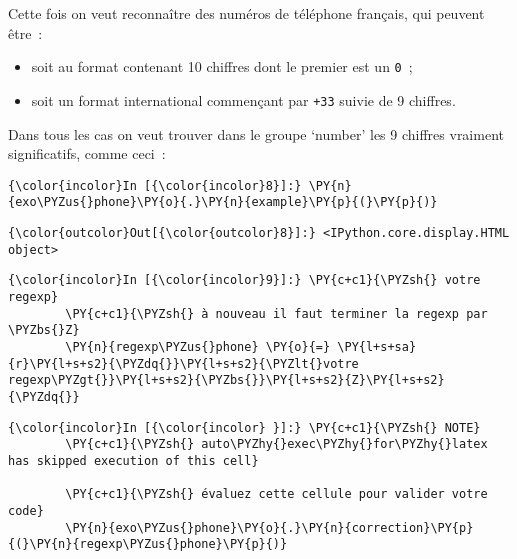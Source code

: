     Cette fois on veut reconnaître des numéros de téléphone français, qui
peuvent être~:

\begin{itemize}
\tightlist
\item
  soit au format contenant 10 chiffres dont le premier est un
  \texttt{0}~;
\item
  soit un format international commençant par \texttt{+33} suivie de 9
  chiffres.
\end{itemize}

Dans tous les cas on veut trouver dans le groupe `number' les 9 chiffres
vraiment significatifs, comme ceci~:

    \begin{Verbatim}[commandchars=\\\{\},frame=single,framerule=0.3mm,rulecolor=\color{cellframecolor}]
{\color{incolor}In [{\color{incolor}8}]:} \PY{n}{exo\PYZus{}phone}\PY{o}{.}\PY{n}{example}\PY{p}{(}\PY{p}{)}
\end{Verbatim}


\begin{Verbatim}[commandchars=\\\{\},frame=single,framerule=0.3mm,rulecolor=\color{cellframecolor}]
{\color{outcolor}Out[{\color{outcolor}8}]:} <IPython.core.display.HTML object>
\end{Verbatim}
            
    \begin{Verbatim}[commandchars=\\\{\},frame=single,framerule=0.3mm,rulecolor=\color{cellframecolor}]
{\color{incolor}In [{\color{incolor}9}]:} \PY{c+c1}{\PYZsh{} votre regexp}
        \PY{c+c1}{\PYZsh{} à nouveau il faut terminer la regexp par \PYZbs{}Z}
        \PY{n}{regexp\PYZus{}phone} \PY{o}{=} \PY{l+s+sa}{r}\PY{l+s+s2}{\PYZdq{}}\PY{l+s+s2}{\PYZlt{}votre regexp\PYZgt{}}\PY{l+s+s2}{\PYZbs{}}\PY{l+s+s2}{Z}\PY{l+s+s2}{\PYZdq{}}
\end{Verbatim}


    \begin{Verbatim}[commandchars=\\\{\},frame=single,framerule=0.3mm,rulecolor=\color{cellframecolor}]
{\color{incolor}In [{\color{incolor} }]:} \PY{c+c1}{\PYZsh{} NOTE}
        \PY{c+c1}{\PYZsh{} auto\PYZhy{}exec\PYZhy{}for\PYZhy{}latex has skipped execution of this cell}
        
        \PY{c+c1}{\PYZsh{} évaluez cette cellule pour valider votre code}
        \PY{n}{exo\PYZus{}phone}\PY{o}{.}\PY{n}{correction}\PY{p}{(}\PY{n}{regexp\PYZus{}phone}\PY{p}{)}
\end{Verbatim}


